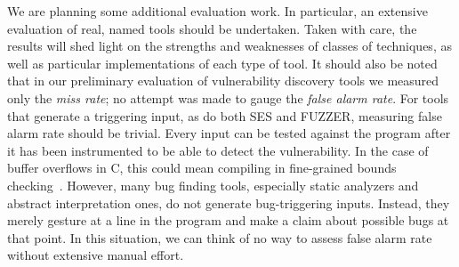 We are planning some additional evaluation work.
In particular, an extensive evaluation of real, named tools should be undertaken.
Taken with care, the results will shed light on the strengths and weaknesses of classes of techniques, as well as particular implementations of each type of tool.
It should also be noted that in our preliminary evaluation of vulnerability discovery tools we measured only the \emph{miss rate}; no attempt was made to gauge the \emph{false alarm rate}.
For tools that generate a triggering input, as do both SES and FUZZER, measuring false alarm rate should be trivial. 
Every input can be tested against the program after it has been instrumented to be able to detect the vulnerability.
In the case of buffer overflows in C, this could mean compiling in fine-grained bounds checking~\cite{ruwase2004practical}.
However, many bug finding tools, especially static analyzers and abstract interpretation ones, do not generate bug-triggering inputs.
Instead, they merely gesture at a line in the program and make a claim about possible bugs at that point.
In this situation, we can think of no way to assess false alarm rate without extensive manual effort.
